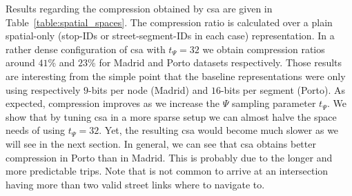 	Results regarding the compression obtained by \gls{csa} are given in Table~\ref{table:spatial_spaces}.
	The compression ratio is calculated over a plain spatial-only (stop-IDs or street-segment-IDs in each case) representation.   %
	In a rather dense 
	configuration of \gls{csa} with $t_{\Psi}=32$ we obtain compression ratios around $41$\% and $23$\% for Madrid and Porto datasets respectively.
	Those results are interesting from the simple point that the baseline representations were only using respectively 
	$9$-bits per node (Madrid) and $16$-bits per segment (Porto). 
	As expected, compression improves as we increase the $\Psi$ sampling parameter $t_{\Psi}$. We show that by tuning 
	\gls{csa} in a more sparse setup we can almost halve the space needs of using $t_{\Psi}=32$. Yet, the resulting \gls{csa} would become
	much slower as we will see in the next section.
	In general, we can see that \gls{csa} obtains better compression in Porto than in Madrid. This is probably due to the longer and
	more predictable trips. Note that is not common to arrive at an intersection having more than two valid 
	street links where to navigate to.


